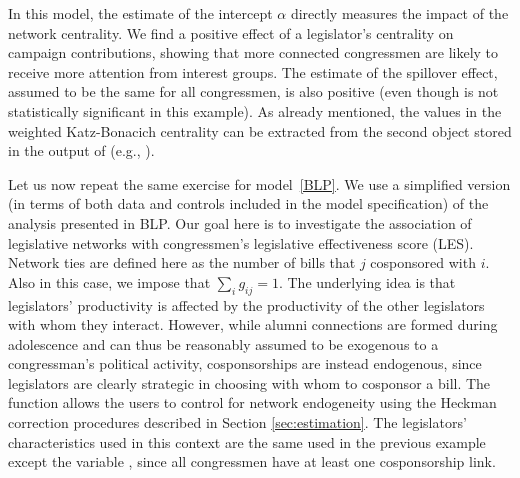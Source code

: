 \documentclass[nojss]{jss}
\begin{document}
	In this model, the estimate of the intercept $\alpha$ directly measures the impact of the network centrality. We find a positive effect of a legislator's centrality on campaign contributions, showing that more connected congressmen are likely to receive more attention from interest groups. The estimate of the spillover effect, assumed to be the same for all congressmen, is also positive (even though is not statistically significant in this example).
	As already mentioned, the values in the weighted Katz-Bonacich centrality can be extracted from the second object stored in the output of  (e.g., ).
	
	Let us now repeat the same exercise for model~\ref{BLP}. We use a simplified version (in terms of both data and controls included in the model specification) of the analysis presented in BLP. Our goal here is to investigate the association of legislative networks with congressmen's legislative effectiveness score (LES). Network ties are defined here as the number
	of bills that $j$ cosponsored with $i$. Also in this case, we impose that $\sum_{i}g_{ij}=1$. The underlying idea is that legislators' productivity is affected by the productivity of the other legislators with whom they interact. However, while alumni connections are formed during adolescence and can thus be reasonably assumed to be exogenous to a congressman's political activity, cosponsorships are instead endogenous, since legislators are clearly strategic in choosing with whom to cosponsor a bill. The function  allows the users to control for network endogeneity using the Heckman correction procedures described in Section \ref{sec:estimation}. The legislators' characteristics used in this context are the same used in the previous example except the variable , since all congressmen have at least one cosponsorship link.
\end{document}
